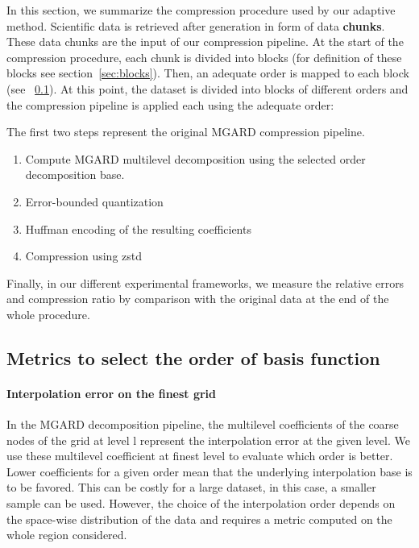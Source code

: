 \documentclass[conference]{IEEEtran}
\theoremstyle{remark}
\begin{document}
In this section, we summarize the compression procedure used by our adaptive method. 
Scientific data is retrieved after generation in form of data \textbf{chunks}. These data chunks are the input of our compression pipeline.
At the start of the compression procedure, each chunk is divided into blocks (for definition of these blocks see section~\ref{sec:blocks}).
Then, an adequate order is mapped to each block (see ~\ref{sec:map}).
At this point, the dataset is divided into blocks of different orders and the compression pipeline is applied each using the adequate order:

The first two steps represent the original MGARD compression pipeline.
\begin{enumerate}
    \item Compute MGARD multilevel decomposition using the selected order decomposition base.
    \item Error-bounded quantization
    \item Huffman encoding of the resulting coefficients
    \item Compression using zstd
\end{enumerate}

Finally, in our different experimental frameworks, we measure the relative errors and compression ratio by comparison with the original data at the end of the whole procedure.




\subsection{Metrics to select the order of basis function}
\label{sec:map}
\paragraph{Interpolation error on the finest grid} 

In the MGARD decomposition pipeline, the multilevel coefficients of the coarse nodes of the grid at level l represent the interpolation error at the given level. We use these multilevel coefficient at finest level to evaluate which order is better.
Lower coefficients for a given order mean that the underlying interpolation base is to be favored.
This can be costly for a large dataset, in this case, a smaller sample can be used. However, the choice of the interpolation order depends on the space-wise distribution of the data and requires a metric computed on the whole region considered.
\end{document}
